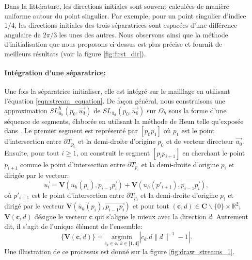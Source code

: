 \begin{remark}
Dans la littérature, les directions initiales sont souvent calculées de manière uniforme autour du point singulier. Par exemple, pour un point singulier d'indice $1/4$, les directions initiales des trois séparatrices sont espacées d'une différence angulaire de $2\pi/3$ les unes des autres. Nous observons ainsi que la méthode d'initialisation que nous proposons ci-dessus est plus précise et fournit de meilleurs résultats (voir la figure \ref{fig:first_dir}).
\end{remark}


\paragraph{Intégration d'une séparatrice:}
Une fois la séparatrice initialiser, elle est intégré sur le mailllage en utilisant l'équation \eqref{eqn:stream_equation}. De façon général, nous construisons une approximation $SL^h_{\bar{u}_h}(p_0, \overrightarrow{u_0})$ de $SL_{\bar{u}_h}(p_0, \overrightarrow{u_0})$ sur $\Omega_h$ sous la forme d'une séquence de segments, élaborée en utilisant la méthode de Heun \cite{ascher1998computer} telle qu'exposée dans \cite{kowalski2013pde}. Le premier segment est représenté par $[p_0p_1]$ où $p_1$ est le point d'intersection entre $\partial T_{p_0}$ et la demi-droite d'origine $p_0$ et de vecteur directeur $\overrightarrow{u_0}$. Ensuite, pour tout $i\geq 1$, on construit le segment  $[p_ip_{i+1}]$ en cherchant le point $p_{i+1}$ comme le point d'intersection entre $\partial T_{p_i}$ et la demi-droite d'origine $p_i$ et dirigée par le vecteur:
\begin{equation}
\overrightarrow{u_i}=\mathbf{V}(\bar{u}_h(p_i), \overrightarrow{p_{i-1}p_i})+\mathbf{V}(\bar{u}_h(p'_{i+1}), \overrightarrow{p_{i-1}p_i}),
\end{equation}
où $p'_{i+1}$ est le point d'intersection entre $\partial T_{p_i}$ et la demi-droite d'origine $p_i$ et dirigé par le vecteur $\mathbf{V}(\bar{u}_h(p_i), \overrightarrow{p_{i-1}p_i})$ et pour tout $(\mathbf{c},d)\in\mathbf{C}\backslash\{0\}\times\mathbb{R}^2$, $\mathbf{V}(\mathbf{c}, d)$ désigne le vecteur $\mathbf{c}$ qui s'aligne le mieux avec la direction $d$. Autrement dit, il s'agit de l'unique élément de l'ensemble:
\begin{equation}
\{\mathbf{V}(\mathbf{c}, d)\}=\underset{c_k\in\mathbf{c},~k\in\llbracket1, 4\rrbracket}{\mathrm{argmin}}|c_k.d\|d\|^{-1}-1|.
\end{equation}
Une illustration de ce processus est donné sur la figure \ref{fig:draw_streams_1}.

